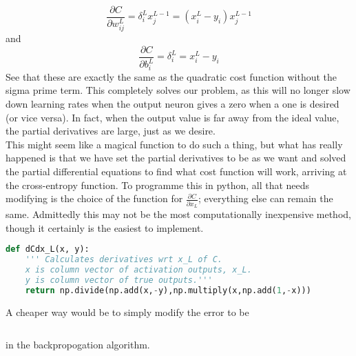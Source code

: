 \documentclass[10pt]{article}
\begin{document}
\[
\frac{\partial C}{\partial w^{L}_{ij}} = \delta^{L}_{i} x^{L-1}_j =
\left(x^{L}_i - y_i\right)x^{L-1}_j
\]
and
\[
\frac{\partial C}{\partial b^{L}_{i}} = \delta^{L}_{i} =
x^{L}_i - y_i
\]
See that these are exactly the same as the quadratic cost function without the sigma prime term. This completely solves our problem, as this will no longer slow down learning rates when the output neuron gives a zero when a one is desired (or vice versa). In fact, when the output value is far away from the ideal value, the partial derivatives are large, just as we desire.\\
This might seem like a magical function to do such a thing, but what has really happened is that we have set the partial derivatives to be as we want and solved the partial differential equations to find what cost function will work, arriving at the cross-entropy function. To programme this in python, all that needs modifying is the choice of the function for $\frac{\partial C}{\partial x_L}$; everything else can remain the same. Admittedly this may not be the most computationally inexpensive method, though it certainly is the easiest to implement.
\begin{lstlisting}[language=Python, breaklines, basicstyle=\small]
def dCdx_L(x, y):
	''' Calculates derivatives wrt x_L of C.
	x is column vector of activation outputs, x_L.
	y is column vector of true outputs.'''
	return np.divide(np.add(x,-y),np.multiply(x,np.add(1,-x)))
\end{lstlisting}
A cheaper way would be to simply modify the error to be
\begin{lstlisting}[language=Python, breaklines, delta = [x_L - y]
\end{lstlisting}
in the backpropogation algorithm.
\end{document}
